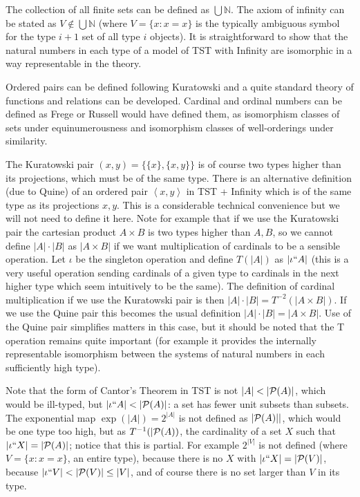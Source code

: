 \documentclass[12pt]{article}
\begin{document}
The collection of all finite sets can be defined as $\bigcup \mathbb N$.  The axiom of infinity can be stated as $V \not\in \bigcup \mathbb N$ (where $V= \{x:x=x\}$ is the typically ambiguous symbol for the type $i+1$ set of all type $i$ objects).  It is straightforward to show that the natural numbers in each type of a model of TST with Infinity are isomorphic in a way representable in the theory.

Ordered pairs can be defined following Kuratowski and a quite standard theory of functions and relations can be developed.  Cardinal and ordinal numbers can be defined as Frege or Russell would have defined them, as isomorphism classes of sets under equinumerousness and isomorphism classes of well-orderings under similarity.  

The Kuratowski pair $(x,y) = \{\{x\},\{x,y\}\}$ is of course two types higher than its projections, which must be of the same type.  There is an alternative definition (due to Quine) of an ordered pair
$\left< x,y\right>$ in TST + Infinity which is of the same type as its projections $x,y$.  This is a considerable technical convenience but we will not need to define it here.  Note for example that if we use the Kuratowski pair the cartesian product $A \times B$ is two types higher than $A,B$, so we cannot define $|A| \cdot |B|$ as $|A \times B|$ if we want multiplication of cardinals to be a sensible operation.  Let $\iota$ be the singleton operation and define $T(|A|)$ as $|\iota``A|$ (this is a very useful operation sending cardinals of a given type to cardinals in the next higher type which seem intuitively to be the same).  The definition of cardinal multiplication if we use the Kuratowski pair is then $|A| \cdot |B| =T^{-2}(|A\times B|)$.  If we use the Quine pair this becomes the usual definition $|A| \cdot |B| =|A\times B|$.  Use of the Quine pair simplifies matters in this case, but it should be noted that the T operation remains quite important (for example it provides the internally representable isomorphism between the systems of natural numbers in each sufficiently high type).

Note that the form of Cantor's Theorem in TST is not $|A| < |{\cal P}(A)|$, which would be ill-typed, but $|\iota``A|<|{\cal P}(A)|$:  a set has fewer unit subsets than subsets.  The exponential map $\exp(|A|) = 2^{|A|}$ is not defined as $|{\cal P}(A)||$, which would be one type too high, but as $T^{-1}(|{\cal P}(A))$, the cardinality of a set $X$ such that $|\iota``X| = |{\cal P}(A)|$;   notice that this is partial.  For example
$2^{|V|}$ is not defined (where $V=\{x:x=x\}$, an entire type), because there is no $X$ with $|\iota``X|=|{\cal P}(V)|$, because $|\iota``V|<|{\cal P}(V)| \leq |V|$, and of course there is no set larger than $V$ in its type.
\end{document}
